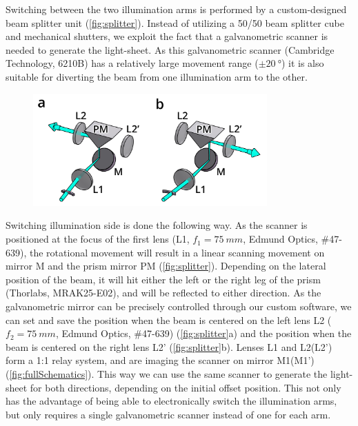     \label{sec:splitter}

    Switching between the two illumination arms is performed by a custom-designed beam splitter unit (\autoref{fig:splitter}). Instead of utilizing a 50/50 beam splitter cube and mechanical shutters, we exploit the fact that a galvanometric scanner is needed to generate the light-sheet. As this galvanometric scanner (Cambridge Technology, 6210B) has a relatively large movement range ($\pm \SI{20}{\degree}$) it is also suitable for diverting the beam from one illumination arm to the other.

    \begin{figure}[htb]
      \centering
      \includegraphics[width=0.8\textwidth]{SW/splitterFigure}
      \label{fig:splitter}
    \end{figure}

    Switching illumination side is done the following way. As the scanner is positioned at the focus of the first lens (L1, $f_1 = \SI{75}{mm}$, Edmund Optics, \#47-639), the rotational movement will result in a linear scanning movement on mirror M and the prism mirror PM (\autoref{fig:splitter}). Depending on the lateral position of the beam, it will hit either the left or the right leg of the prism (Thorlabs, MRAK25-E02), and will be reflected to either direction. As the galvanometric mirror can be precisely controlled through our custom software, we can set and save the position when the beam is centered on the left lens L2 ($f_2 = \SI{75}{mm}$, Edmund Optics, \#47-639) (\autoref{fig:splitter}a) and the position when the beam is centered on the right lens L2' (\autoref{fig:splitter}b). Lenses L1 and L2(L2') form a 1:1 relay system, and are imaging the scanner on mirror M1(M1') (\autoref{fig:fullSchematics}). This way we can use the same scanner to generate the light-sheet for both directions, depending on the initial offset position. This not only has the advantage of being able to electronically switch the illumination arms, but only requires a single galvanometric scanner instead of one for each arm.
    
